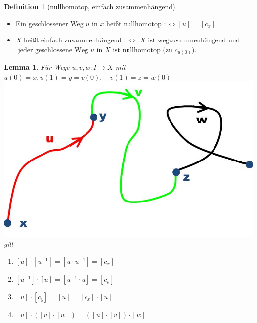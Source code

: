 \documentclass[a4paper,11pt,notitlepage]{report}
\newtheorem{lemma}{Lemma}[chapter]
\theoremstyle{remark}
\theoremstyle{definition}
\newtheorem{definition}{Definition}[chapter]
\begin{document}
\begin{definition}[nullhomotop, einfach zusammenhängend]
	\begin{itemize}
	\item Ein geschlossener Weg $u$ in $x$ heißt \underline{nullhomotop} \newline
		$:\Leftrightarrow [u] = [c_x]$
	\item $X$ heißt \underline{einfach zusammenhängend} $:\Leftrightarrow$ \newline
	$X \text{ ist wegzusammenhängend und}$ \newline $\text{ jeder geschlossene Weg $u$ in $X$ ist nullhomotop (zu $c_{u(0)}$).}$
	\end{itemize}
\end{definition}

\begin{lemma}{}
	Für Wege $u,v,w \colon I \rightarrow X$ \newline mit $u(0)=x, u(1)=y=v(0), \quad v(1)=z= w(0)$ \includegraphics[scale=0.4]{images/Produkt_Lemma.jpg} gilt
	\begin{enumerate}
		\item $[u] \cdot [u^{-1}] = [u \cdot u^{-1}] = [c_x]$
		\item $[u^{-1}] \cdot [u] = [u^{-1} \cdot u] = [c_y]$
		\item $[u] \cdot [c_y] = [u] = [c_x] \cdot [u]$
		\item $[u] \cdot ([v] \cdot [w]) = ([u] \cdot [v]) \cdot [w]$
	\end{enumerate}
\end{lemma}
\end{document}
